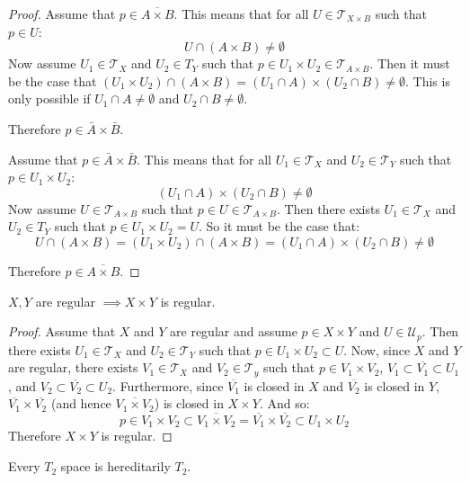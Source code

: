 \documentclass[letterpaper,12pt,fleqn]{article}
\newcommand{\T}{\mathscr{T}}
\newcommand{\U}{\mathcal{U}}
\begin{document}
\begin{proof}
  Assume that \(p\in\overline{A\times B}\).  This means that for all \(U\in\T_{X\times B}\) such that \(p\in U\):
  \[U\cap(A\times B)\ne\emptyset\]
  Now assume \(U_1\in\T_X\) and \(U_2\in T_Y\) such that \(p\in U_1\times U_2\in\T_{A\times B}\).  Then it must be the
  case that \((U_1\times U_2)\cap(A\times B)=(U_1\cap A)\times(U_2\cap B)\ne\emptyset\).  This is only possible if
  \(U_1\cap A\ne\emptyset\) and \(U_2\cap B\ne\emptyset\).

  Therefore \(p\in\bar{A}\times\bar{B}\).

  Assume that \(p\in\bar{A}\times\bar{B}\).  This means that for all \(U_1\in\T_X\) and \(U_2\in\T_Y\) such that
  \(p\in U_1\times U_2\):
  \[(U_1\cap A)\times(U_2\cap B)\ne\emptyset\]
  Now assume \(U\in\T_{A\times B}\) such that \(p\in U\in\T_{A\times B}\).  Then there exists \(U_1\in\T_X\) and
  \(U_2\in T_Y\) such that \(p\in U_1\times U_2=U\).  So it must be the case that:
  \[U\cap(A\times B)=(U_1\times U_2)\cap(A\times B)=(U_1\cap A)\times(U_2\cap B)\ne\emptyset\]

  Therefore \(p\in\overline{A\times B}\).
\end{proof}

\begin{theorem}[4.17]
  \(X,Y\) are regular \(\implies X\times Y\) is regular.
\end{theorem}

\begin{proof}
  Assume that \(X\) and \(Y\) are regular and assume \(p\in X\times Y\) and \(U\in\U_p\).  Then there exists
  \(U_1\in\T_X\) and \(U_2\in\T_Y\) such that \(p\in U_1\times U_2\subset U\).  Now, since \(X\) and \(Y\) are
  regular, there exists \(V_1\in\T_X\) and \(V_2\in\T_y\) such that \(p\in V_1\times V_2\),
  \(V_1\subset\overline{V_1}\subset U_1\), and \(V_2\subset\overline{V_2}\subset U_2\).  Furthermore, since
  \(\overline{V_1}\) is closed in \(X\) and \(\overline{V_2}\) is closed in \(Y\),
  \(\overline{V_1}\times\overline{V_2}\) (and hence \(\overline{V_1\times V_2}\)) is closed in \(X\times Y\).
  And so:
  \[p\in V_1\times V_2\subset\overline{V_1\times V_2}=\overline{V_1}\times\overline{V_2}\subset U_1\times U_2\]
  Therefore \(X\times Y\) is regular.
\end{proof}

\begin{theorem}[4.19]
  Every \(T_2\) space is hereditarily \(T_2\).
\end{theorem}
\end{document}

